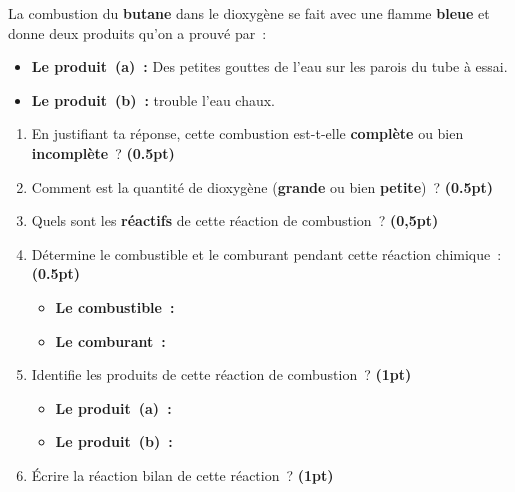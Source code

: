 La combustion du \textbf{butane} dans le dioxygène se fait avec une flamme
\textbf{bleue} et donne deux produits qu'on a prouvé par~:
\begin{itemize}
    \item \textbf{Le produit~(a)~:} Des petites gouttes de l'eau sur les parois
          du tube à essai.
    \item \textbf{Le produit~(b)~:} trouble l'eau chaux.
\end{itemize}
\begin{enumerate}
    \item En justifiant ta réponse, cette combustion est-t-elle
          \textbf{complète} ou bien \textbf{incomplète}~?
          \textbf{(0.5pt)} \par
    \item Comment est la quantité de dioxygène (\textbf{grande} ou
          bien \textbf{petite})~?
          \textbf{(0.5pt)} \par
    \item Quels sont les \textbf{réactifs} de cette réaction de combustion~?
          \textbf{(0,5pt)} \par
    \item Détermine le combustible et le comburant pendant cette réaction
          chimique~:
          \textbf{(0.5pt)} \par
          \begin{itemize}
              \item \textbf{Le combustible~:} 
              \item \textbf{Le comburant~:} 
          \end{itemize}
    \item Identifie les produits de cette réaction de combustion~?
          \textbf{(1pt)} \par
          \begin{itemize}
              \item \textbf{Le produit~(a)~:} 
              \item \textbf{Le produit~(b)~:} 
          \end{itemize}
    \item Écrire la réaction bilan de cette réaction~?
          \textbf{(1pt)} \par

\end{enumerate}
